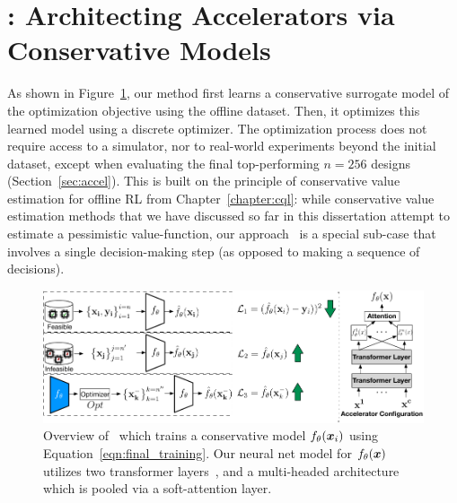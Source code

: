 \vspace{-0.2cm}
\section{\primemethodname: Architecting Accelerators via Conservative Models}
\label{sec:prime_method}
\vspace{-0.2cm}
%
As shown in Figure~\ref{fig:prime_method}, our method first learns a conservative surrogate model of the optimization objective using the offline dataset. Then, it optimizes this learned model using a discrete optimizer. The optimization process does not require access to a simulator, nor to real-world experiments beyond the initial dataset, except when evaluating the final top-performing $n=256$ designs (Section~\ref{sec:accel}). This is built on the principle of conservative value estimation for offline RL from Chapter~\ref{chapter:cql}: while conservative value estimation methods that we have discussed so far in this dissertation attempt to estimate a pessimistic value-function, our approach \primemethodname\ is a special sub-case that involves a single decision-making step (as opposed to making a sequence of decisions).

\begin{figure}
    \centering
    \vspace{-0.3cm}
    \includegraphics[width=0.7\linewidth]{chapters/prime/figs/overview/mbo-method.pdf}
    \vspace{-0.1cm}
    \caption{\small{Overview of \primemethodname\ which trains a conservative model ${f}_\theta({\boldsymbol{x}}_i)$ using Equation~\ref{eqn:final_training}. Our neural net model for ${f}_\theta({\boldsymbol{x}})$ utilizes two transformer layers~\citep{vaswani2017attention}, and a multi-headed architecture which is pooled via a soft-attention layer.}}
    \vspace{-0.3cm}
    \label{fig:prime_method}
\end{figure}

\vspace{-0.2cm}
